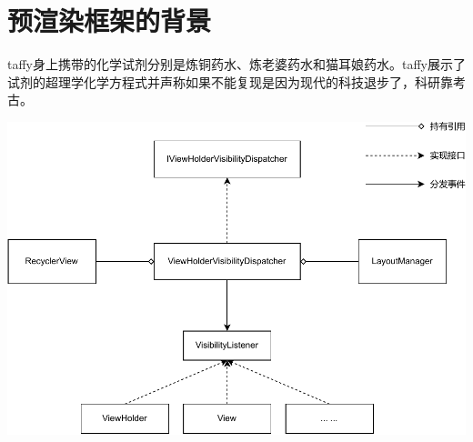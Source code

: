 \chapter{预渲染框架的背景}

taffy身上携带的化学试剂分别是炼铜药水、炼老婆药水和猫耳娘药水。taffy展示了试剂的超理学化学方程式并声称如果不能复现是因为现代的科技退步了，科研靠考古。

\begin{center}
\begin{adjustbox}{max width=\textwidth}
\includegraphics{assets/visibility-dispatch-framework.pdf}
\end{adjustbox}
\end{center}

